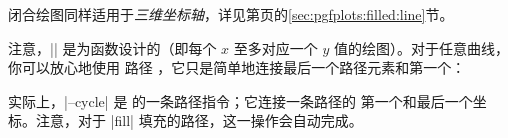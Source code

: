 闭合绘图同样适用于\emph{三维坐标轴}，详见第\pageref{sec:pgfplots:filled:line}页的\ref{sec:pgfplots:filled:line}节。

注意，|\closedcycle| 是为函数设计的（即每个 $x$ 至多对应一个 $y$
值的绘图）。对于任意曲线，你可以放心地使用 \tikzname{} 路径
，它只是简单地连接最后一个路径元素和第一个：
%
\begin{codeexample}[]
\end{codeexample}

\begin{codeexample}[]
\end{codeexample}

\begin{codeexample}[]
\end{codeexample}

实际上，|--cycle| 是 \cite{tikz} 的一条路径指令；它连接一条路径的
第一个和最后一个坐标。注意，对于 |fill| 填充的路径，这一操作会自动完成。
